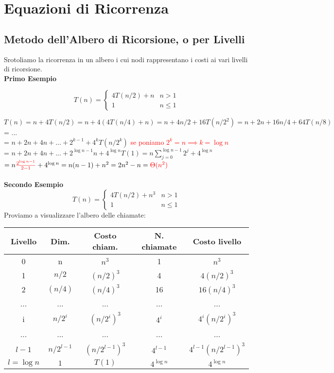 \documentclass[../cheatSheetAlgoritmi.tex]{subfiles}
\begin{document}
\section{Equazioni di Ricorrenza}
\subsection{Metodo dell'Albero di Ricorsione, o per Livelli}
Srotoliamo la ricorrenza in un albero i cui nodi rappresentano i costi ai vari livelli di ricorsione.\\
\textbf{Primo Esempio}
\begin{center}
	\begin{equation*}
  		T(n)=\begin{cases}
    		4T(n/2) + n & \text{$n > 1$}\\
    		1 & \text{$n \leq 1$}
  		\end{cases}
	\end{equation*}
\end{center}
$T(n) = n + 4T(n/2) = n + 4(4T(n/4) + n) = n + 4n/2 + 16T(n/2^{2}) = n + 2n + 16n/4 + 64T(n/8)$\\
= ...\\
= $n + 2n + 4n + ... + 2^{k-1} + 4^{k}T(n/2^{k})$ \textcolor{red}{se poniamo $2^{k} = n \implies k = \log{n}$}\\
= $n + 2n + 4n + ... + 2^{\log{n-1}}n + 4^{\log{n}}T(1) = n \sum\limits_{j=0}^{\log{n-1}} {2^{j}} + 4^{\log{n}}$\\
$= n \textcolor{red}{\frac{2^{\log{n}-1}}{2-1}} + 4^{\log{n}} = n(n-1) + n^{2} = 2n^{2} - n = \textcolor{red}{\Theta(n^{2})}$\\\\
\textbf{Secondo Esempio}
	\begin{equation*}
  		T(n)=\begin{cases}
    		4T(n/2) + n^{3} & \text{$n > 1$}\\
    		1 & \text{$n \leq 1$}
  		\end{cases}
	\end{equation*}
Proviamo a visualizzare l'albero delle chiamate:
\begin{center}
	\renewcommand{\arraystretch}{1.2}
	\begin{tabular}{ |c|c|c|c|c| } 
		\hline
			Livello & Dim. & Costo chiam. & N. chiamate & Costo livello \\ 
		\hline
			0 & n & $n^3$ & 1 & $n^3$ \\ 
		\hline
			1 & $n/2$ & $(n/2)^{3}$ & 4 & $4(n/2)^{3}$\\ 
		\hline
			2 & $(n/4)$ & $(n/4)^{3}$ & 16 & $16(n/4)^{3}$\\
		\hline
			... & ... & ... & ... & ...\\
		\hline
			i & $n/2^{i}$ & $(n/2^{i})^{3}$ & $4^{i}$ & $4^{i}(n/2^{i})^{3}$\\
		\hline
			... & ... & ... & ... & ...\\
		\hline
			$l-1$ & $n/2^{l-1}$ & $(n/2^{l-1})^{3}$ & $4^{l-1}$ & $4^{l-1}(n/2^{l-1})^{3}$\\
		\hline
			$l = \log{n}$ & $1$ & $T(1)$ & $4^{\log{n}}$ & $4^{\log{n}}$\\
		\hline
	\end{tabular}
\end{center}
\end{document}
